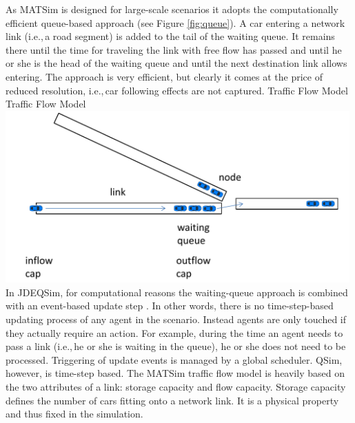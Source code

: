 As MATSim is designed for large-scale scenarios it adopts the computationally efficient queue-based approach (see Figure \ref{fig:queue}). A car entering a network link (i.e.,\,a road segment) is added to the tail of the waiting queue. It remains there until the time for traveling the link with free flow has passed and until he or she is the head of the waiting queue and until the next destination link allows entering. The approach is very efficient, but clearly it comes at the price of reduced resolution, i.e.,\,car following effects are not captured.   
%
\createfigure%
{Traffic Flow Model}%
{Traffic Flow Model}%
{\label{fig:queue}}%
{\includegraphics[width=0.99\textwidth, angle=0]{using/figures/queue.pdf}}%
{}
%
In JDEQSim, for computational reasons the waiting-queue approach is combined with an event-based update step \citep[][]{CharyparEtAl_TRB_2009}. In other words, there is no time-step-based updating process of any agent in the scenario. Instead agents are only touched if they actually require an action. For example, during the time an agent needs to pass a link (i.e.,\,he or she is waiting in the queue), he or she does not need to be processed.  
%
Triggering of update events is managed by a global scheduler. QSim, however, is time-step based. 
%
%
%
The MATSim traffic flow model is heavily based on the two attributes of a link: storage capacity and flow capacity. Storage capacity defines the number of cars fitting onto a network link. It is a physical property and thus fixed in the simulation. 

